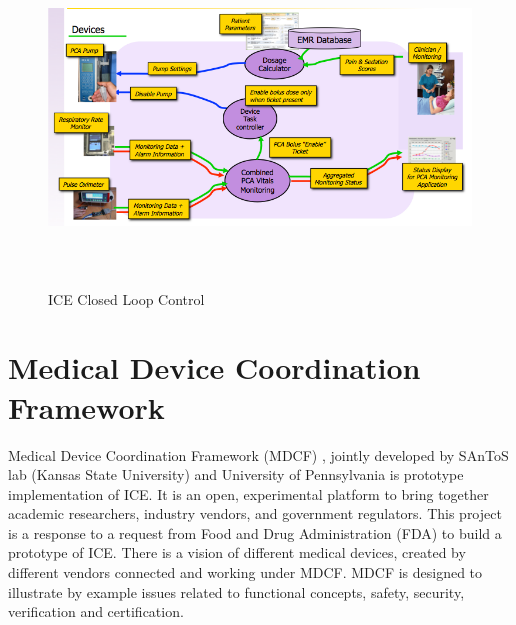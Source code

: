 \begin{figure}[ht]%
    \begin{center}
    	\includegraphics[height=3.5in]{figures/ice.png}   	
    \end{center}
    \caption{ICE Closed Loop Control}
    \label{figure:ice}
\end{figure}


\section{Medical Device Coordination Framework}
\label{background:mdcf}

Medical Device Coordination Framework (MDCF) \cite{MedicalApplicationPlatforms:Paper}, jointly developed by SAnToS lab (Kansas State University) and University of Pennsylvania is prototype implementation of ICE. It is an open, experimental platform to bring together academic researchers, industry vendors, and government regulators. This project is a response to a request from Food and Drug Administration (FDA) to build a prototype of ICE. There is a vision of different medical devices, created by different vendors connected and working under MDCF. MDCF is designed to illustrate by example issues related to functional concepts, safety, security, verification and certification. 

